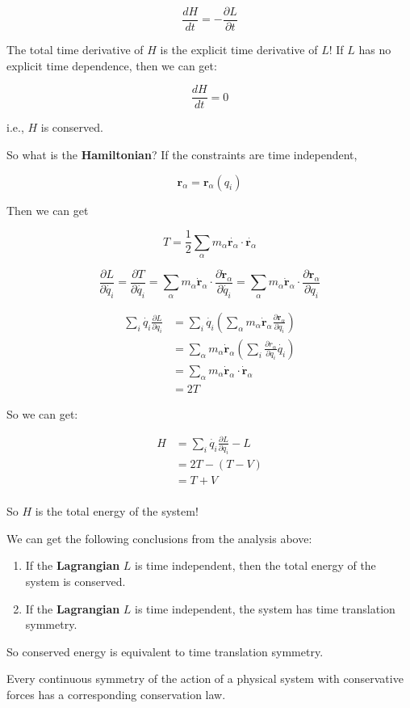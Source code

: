\[
    \frac{dH}{dt}=-\frac{\partial L}{\partial t}
\]

The total time derivative of $H$ is the explicit time derivative of $L$! If $L$ has no explicit time dependence, then we can get:

\[
    \frac{dH}{dt}=0
\]

i.e., $H$ is conserved.

So what is the \textbf{Hamiltonian}? If the constraints are time independent,

\[
    \mathbf{r}_\alpha=\mathbf{r}_\alpha (q_i)
\]

Then we can get

\[
    T=\frac{1}{2} \sum_\alpha m_\alpha \dot{\mathbf{r}_\alpha} \cdot \dot{\mathbf{r}_\alpha}
\]

\[
    \frac{\partial L}{\partial \dot{q_i}} = \frac{\partial T}{\partial \dot{q_i}} = \sum_\alpha m_\alpha \dot{\mathbf{r}}_\alpha \cdot \frac{\partial \dot{\mathbf{r}}_\alpha}{\partial \dot{q_i}} = \sum_\alpha m_\alpha \dot{\mathbf{r}}_\alpha \cdot \frac{\partial \mathbf{r}_\alpha}{\partial q_i}
\]

\begin{align*}
    \sum_i \dot{q_i} \frac{\partial L}{\partial q_i} &= \sum_i \dot{q_i} \left(\sum_\alpha m_\alpha \dot{\mathbf{r}}_\alpha  \frac{\partial \mathbf{r}_\alpha}{\partial q_i}\right) \\
    &= \sum_\alpha m_\alpha \dot{\mathbf{r}}_\alpha \left(\sum_i \frac{\partial r_\alpha}{\partial q_i} \dot{q_i}\right) \\
    &= \sum_\alpha m_\alpha \dot{\mathbf{r}}_\alpha \cdot \dot{\mathbf{r}}_\alpha \\
    &= 2T
\end{align*}

So we can get:

\begin{align*}
    H &= \sum_i \dot{q_i} \frac{\partial L}{\partial q_i} - L \\
    &= 2T - \left(T - V\right) \\
    &= T + V \\
\end{align*}

So $H$ is the total energy of the system!

We can get the following conclusions from the analysis above:

\begin{enumerate}
    \item If the \textbf{Lagrangian} $L$ is time independent, then the total energy of the system is conserved.
    \item If the \textbf{Lagrangian} $L$ is time independent, the system has time translation symmetry.
\end{enumerate}

So conserved energy is equivalent to time translation symmetry.

\begin{definition}
    Every continuous symmetry of the action of a physical system with conservative forces has a corresponding conservation law.
\end{definition}


